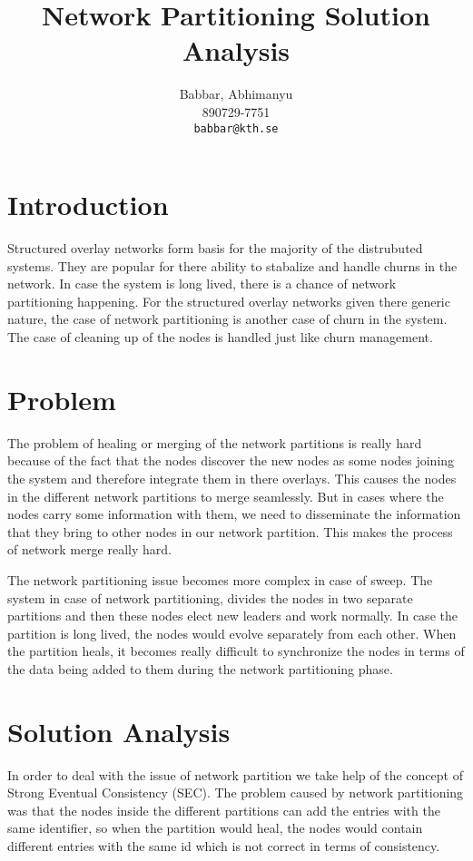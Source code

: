 \documentclass[a4paper, 11pt]{article}
\author{
  Babbar, Abhimanyu\\
  \textsc{890729-7751}\\
  \texttt{babbar@kth.se}
}
\title{Network Partitioning Solution Analysis}
\begin{document}
\maketitle 

\section{Introduction}

Structured overlay networks form basis for the majority of the distrubuted systems. They are popular for there ability to stabalize and handle churns in the network. In case the system is long lived, there is a chance of network partitioning happening. For the structured overlay networks given there generic nature, the case of network partitioning is another case of churn in the system. The case of cleaning up of the nodes is handled just like churn management. \\



\section{Problem}

The problem of healing or merging of the network partitions is really hard because of the fact that the nodes discover the new nodes as some nodes joining the system and therefore integrate them in there overlays. This causes the nodes in the different network partitions to merge seamlessly. But in cases where the nodes carry some information with them, we need to disseminate the information that they bring to other nodes in our network partition. This makes the process of network merge really hard.

The network partitioning issue becomes more complex in case of sweep. The system in case of network partitioning, divides the nodes in two separate partitions and then these nodes elect new leaders and work normally. In case the partition is long lived, the nodes would evolve separately from each other. 
When the partition heals, it becomes really difficult to synchronize the nodes in terms of the data being added to them during the network partitioning phase.

\section{Solution Analysis}

In order to deal with the issue of network partition we take help of the concept of Strong Eventual Consistency (SEC). The problem caused by network partitioning was that the nodes inside the different partitions can add the entries with the same identifier, so when the partition would heal, the nodes would contain different entries with the same id which is not correct in terms of consistency.\\
\end{document}
